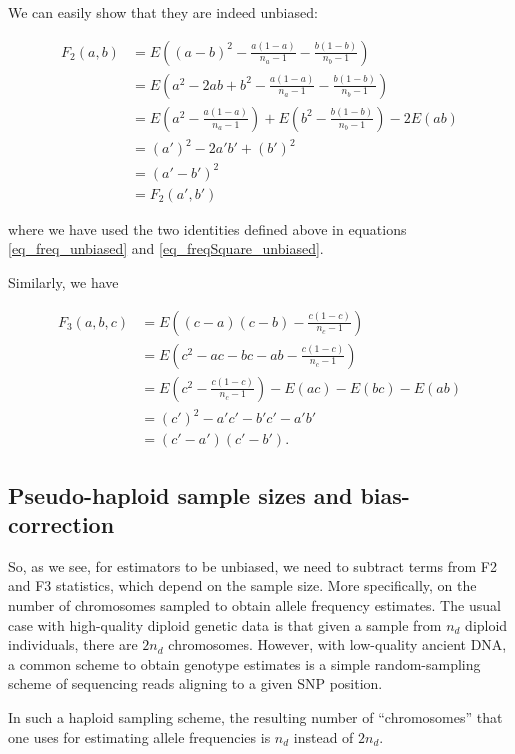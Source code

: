 \documentclass{article}
\begin{document}
We can easily show that they are indeed unbiased:

\begin{equation}
\begin{split}
F_2(a,b) &= E\left( (a-b)^2-\frac{a(1-a)}{n_a-1}-\frac{b(1-b)}{n_b-1}\right) \\
&= E\left( a^2-2a b+b^2-\frac{a(1-a)}{n_a-1}-\frac{b(1-b)}{n_b-1}\right)\\
&= E\left( a^2-\frac{a(1-a)}{n_a-1}\right) +E\left( b^2-\frac{b(1-b)}{n_b-1}\right) -2 E(a b) \\
&=(a')^2-2 a' b' +(b')^2\\
&=(a'-b')^2\\
&=F_2(a',b')
\end{split}
\end{equation}

where we have used the two identities defined above in equations \ref{eq_freq_unbiased} and \ref{eq_freqSquare_unbiased}.

Similarly, we have

\begin{equation}
\begin{split}
F_3(a,b,c) &= E\left( (c-a)(c-b)-\frac{c(1-c)}{n_c-1}\right) \\
&= E\left( c^2-a c- b c - a b-\frac{c(1-c)}{n_c-1}\right) \\
&= E\left( c^2-\frac{c(1-c)}{n_c-1}\right) -E(a c) -E(b c)  -E( a b) \\
&= (c')^2-a' c'-b'c'-a'b'\\
&= (c'-a')(c'-b').
\end{split}
\end{equation}

\subsection{Pseudo-haploid sample sizes and bias-correction}

So, as we see, for estimators to be unbiased, we need to subtract terms from F2 and F3 statistics, which depend on the sample size. More specifically, on the number of chromosomes sampled to obtain allele frequency estimates. The usual case with high-quality diploid genetic data is that given a sample from \(n_d\) diploid individuals, there are \(2n_d\) chromosomes. However, with low-quality ancient DNA, a common scheme to obtain genotype estimates is a simple random-sampling scheme of sequencing reads aligning to a given SNP position.

In such a haploid sampling scheme, the resulting number of {``}chromosomes{''} that one uses for estimating allele frequencies is \(n_d\) instead of \(2n_d\). 
\end{document}
